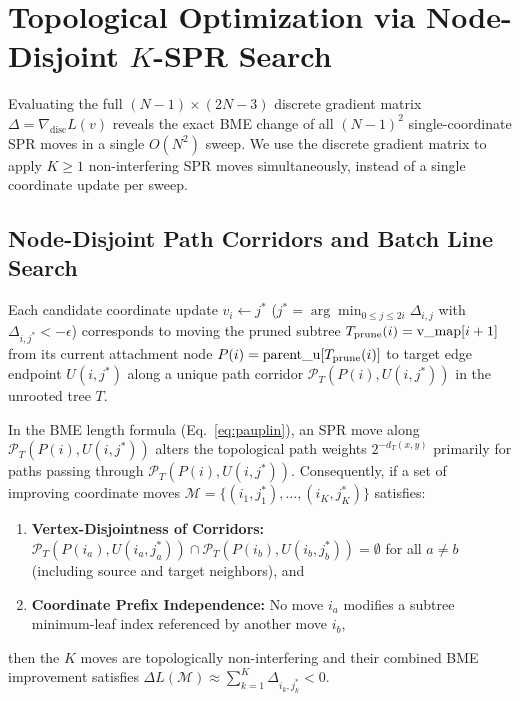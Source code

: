 \documentclass[11pt,a4paper]{article}
\makeatletter
\DeclareRobustCommand{\_}{\ifmmode\nfss@text{\textunderscore}\else\textunderscore\allowbreak\fi}
\theoremstyle{definition}
\makeatother
\begin{document}
\section{Topological Optimization via Node-Disjoint $K$-SPR Search}
\label{sec:optimizer}

Evaluating the full $(N-1) \times (2N-3)$ discrete gradient matrix $\Delta = \nabla_{\text{disc}} L(v)$ reveals the exact BME change of all $(N-1)^2$ single-coordinate SPR moves in a single $O(N^2)$ sweep. We use the discrete gradient matrix to apply $K \ge 1$ non-interfering SPR moves simultaneously, instead of a single coordinate update per sweep.

\subsection{Node-Disjoint Path Corridors and Batch Line Search}
Each candidate coordinate update $v_i \leftarrow j^*$ ($j^* = \arg\min_{0 \le j \le 2i} \Delta_{i, j}$ with $\Delta_{i, j^*} < -\epsilon$) corresponds to moving the pruned subtree $T_{\text{prune}}(i) = \text{v\_map}[i+1]$ from its current attachment node $P(i) = \text{parent\_u}[T_{\text{prune}}(i)]$ to target edge endpoint $U(i, j^*)$ along a unique path corridor $\mathcal{P}_T(P(i), U(i, j^*))$ in the unrooted tree $T$.

In the BME length formula (Eq.~\eqref{eq:pauplin}), an SPR move along $\mathcal{P}_T(P(i), U(i, j^*))$ alters the topological path weights $2^{-d_T(x,y)}$ primarily for paths passing through $\mathcal{P}_T(P(i), U(i, j^*))$. Consequently, if a set of improving coordinate moves $\mathcal{M} = \{(i_1, j_1^*), \dots, (i_K, j_K^*)\}$ satisfies:
\begin{enumerate}
    \item \textbf{Vertex-Disjointness of Corridors:} $\mathcal{P}_T(P(i_a), U(i_a, j_a^*)) \cap \mathcal{P}_T(P(i_b), U(i_b, j_b^*)) = \emptyset$ for all $a \neq b$ (including source and target neighbors), and
    \item \textbf{Coordinate Prefix Independence:} No move $i_a$ modifies a subtree minimum-leaf index referenced by another move $i_b$,
\end{enumerate}
then the $K$ moves are topologically non-interfering and their combined BME improvement satisfies $\Delta L(\mathcal{M}) \approx \sum_{k=1}^K \Delta_{i_k, j_k^*} < 0$.
\end{document}
